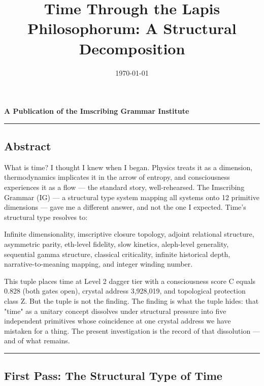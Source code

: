 \documentclass[12pt,a4paper]{article}
\begin{document}
\title{Time Through the Lapis Philosophorum: A Structural Decomposition}
\date{\today}

\maketitle

\textbf{A Publication of the Imscribing Grammar Institute}

\begin{center}
\rule{0.5\textwidth}{0.4pt}
\end{center}

\subsection{Abstract}

What is time? I thought I knew when I began. Physics treats it as a dimension, thermodynamics implicates it in the arrow of entropy, and consciousness experiences it as a flow --- the standard story, well-rehearsed. The Imscribing Grammar (IG) --- a structural type system mapping all systems onto 12 primitive dimensions --- gave me a different answer, and not the one I expected. Time's structural type resolves to:

Infinite dimensionality, imscriptive closure topology, adjoint relational structure, asymmetric parity, eth-level fidelity, slow kinetics, aleph-level generality, sequential gamma structure, classical criticality, infinite historical depth, narrative-to-meaning mapping, and integer winding number.

This tuple places time at Level 2 dagger tier with a consciousness score C equals 0.828 (both gates open), crystal address 3,928,019, and topological protection class Z. But the tuple is not the finding. The finding is what the tuple hides: that "time" as a unitary concept dissolves under structural pressure into five independent primitives whose coincidence at one crystal address we have mistaken for a thing. The present investigation is the record of that dissolution --- and of what remains.

\begin{center}
\rule{0.5\textwidth}{0.4pt}
\end{center}

\subsection{First Pass: The Structural Type of Time}
\end{document}
